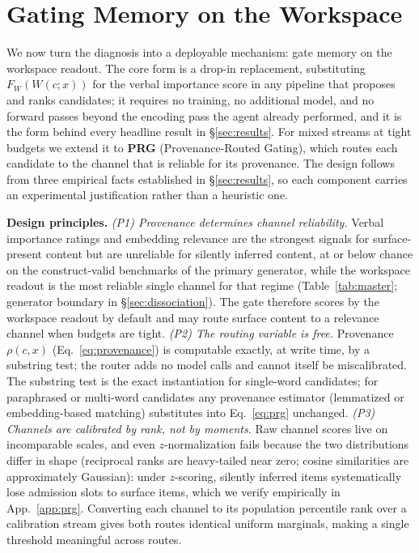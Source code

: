 \section{Gating Memory on the Workspace}
\label{sec:method}

We now turn the diagnosis into a deployable mechanism: gate memory on the
workspace readout. The core form is a drop-in replacement, substituting
$F_W(W(c;x))$ for the verbal importance score in any pipeline that proposes
and ranks candidates; it requires no training, no additional model, and no
forward passes beyond the encoding pass the agent already performed, and it
is the form behind every headline result in \S\ref{sec:results}. For mixed
streams at tight budgets we extend it to \textbf{PRG} (Provenance-Routed
Gating), which routes each candidate to the channel that is reliable for its
provenance. The design follows from three empirical facts established in
\S\ref{sec:results}, so each component carries an experimental justification
rather than a heuristic one.

\textbf{Design principles.}
\emph{(P1) Provenance determines channel reliability.} Verbal importance
ratings and embedding relevance are the strongest signals for surface-present
content but are unreliable for silently inferred content, at or below chance
on the construct-valid benchmarks of the primary generator, while the
workspace readout is the most reliable single channel for that regime
(Table~\ref{tab:master}; generator boundary in \S\ref{sec:dissociation}).
The gate therefore scores by the workspace readout by default and may route
surface content to a relevance channel when budgets are tight.
\emph{(P2) The routing variable is free.} Provenance $\rho(c,x)$
(Eq.~\ref{eq:provenance}) is computable exactly, at write time, by a substring
test; the router adds no model calls and cannot itself be miscalibrated. The
substring test is the exact instantiation for single-word candidates; for
paraphrased or multi-word candidates any provenance estimator (lemmatized or
embedding-based matching) substitutes into Eq.~\ref{eq:prg} unchanged.
\emph{(P3) Channels are calibrated by rank, not by moments.} Raw channel scores
live on incomparable scales, and even $z$-normalization fails because the two
distributions differ in shape (reciprocal ranks are heavy-tailed near zero;
cosine similarities are approximately Gaussian): under $z$-scoring, silently
inferred items systematically lose admission slots to surface items, which we
verify empirically in App.~\ref{app:prg}. Converting each channel to its
population percentile rank over a calibration stream gives both routes
identical uniform marginals, making a single threshold meaningful across
routes.

